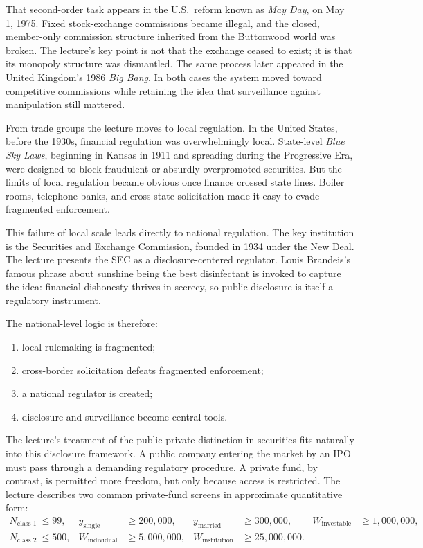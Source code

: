 That second-order task appears in the U.S.\ reform known as \emph{May Day}, on May 1, 1975. Fixed stock-exchange commissions became illegal, and the closed, member-only commission structure inherited from the Buttonwood world was broken. The lecture's key point is not that the exchange ceased to exist; it is that its monopoly structure was dismantled. The same process later appeared in the United Kingdom's 1986 \emph{Big Bang}. In both cases the system moved toward competitive commissions while retaining the idea that surveillance against manipulation still mattered.

From trade groups the lecture moves to local regulation. In the United States, before the 1930s, financial regulation was overwhelmingly local. State-level \emph{Blue Sky Laws}, beginning in Kansas in 1911 and spreading during the Progressive Era, were designed to block fraudulent or absurdly overpromoted securities. But the limits of local regulation became obvious once finance crossed state lines. Boiler rooms, telephone banks, and cross-state solicitation made it easy to evade fragmented enforcement.

This failure of local scale leads directly to national regulation. The key institution is the Securities and Exchange Commission, founded in 1934 under the New Deal. The lecture presents the SEC as a disclosure-centered regulator. Louis Brandeis's famous phrase about sunshine being the best disinfectant is invoked to capture the idea: financial dishonesty thrives in secrecy, so public disclosure is itself a regulatory instrument.

The national-level logic is therefore:
\begin{enumerate}
\item local rulemaking is fragmented;
\item cross-border solicitation defeats fragmented enforcement;
\item a national regulator is created;
\item disclosure and surveillance become central tools.
\end{enumerate}

The lecture's treatment of the public-private distinction in securities fits naturally into this disclosure framework. A public company entering the market by an IPO must pass through a demanding regulatory procedure. A private fund, by contrast, is permitted more freedom, but only because access is restricted. The lecture describes two common private-fund screens in approximate quantitative form:
\begin{align}
N_{\text{class 1}} &\le 99,
&
y_{\text{single}} &\ge 200{,}000,
&
y_{\text{married}} &\ge 300{,}000,
&
W_{\text{investable}} &\ge 1{,}000{,}000,
\\
N_{\text{class 2}} &\le 500,
&
W_{\text{individual}} &\ge 5{,}000{,}000,
&
W_{\text{institution}} &\ge 25{,}000{,}000.
\end{align}

